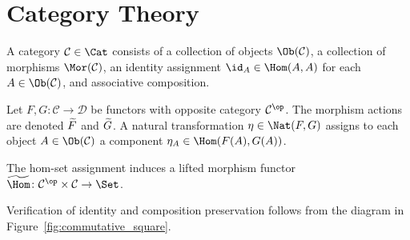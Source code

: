 \section{Category Theory}

\begin{definition}
A category $\mathcal{C} \in \Cat$ consists of a collection of objects $\Ob(\mathcal{C})$, a collection of morphisms $\Mor(\mathcal{C})$, an identity assignment $\id_A \in \Hom(A, A)$ for each $A \in \Ob(\mathcal{C})$, and associative composition.
\end{definition}

\begin{definition}
Let $F, G \colon \mathcal{C} \to \mathcal{D}$ be functors with opposite category $\mathcal{C}^{\op}$. The morphism actions are denoted $\widetilde{F}$ and $\widetilde{G}$. A natural transformation $\eta \in \Nat(F, G)$ assigns to each object $A \in \Ob(\mathcal{C})$ a component $\eta_A \in \Hom(F(A), G(A))$.
\end{definition}



\begin{lemma}
The hom-set assignment induces a lifted morphism functor $\HomMor \colon \mathcal{C}^{\op} \times \mathcal{C} \to \Set$.
\end{lemma}

\myprf
Verification of identity and composition preservation follows from the diagram in Figure~\ref{fig:commutative_square}.
\myqed
